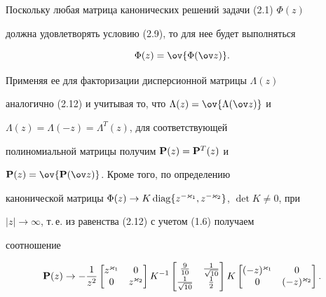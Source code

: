\begin{pf}
 


Поскольку любая матрица канонических решений задачи (2.1) $\Phi(z)$ 


должна удовлетворять условию (2.9), то для нее будет выполняться 


$$ 


\Phi(z)=\ov{\Phi(\ov z)}. 


$$ 


Применяя ее для факторизации дисперсионной матрицы $\Lambda(z)$ 


аналогично (2.12) и учитывая то, что $\Lambda(z)=\ov{\Lambda(\ov z)}$ и 


$\Lambda(z)=\Lambda(-z)=\Lambda^T(z)$, для соответствующей 


полиномиальной матрицы получим $\bold P(z)=\bold P^T(z)$ и 


$\bold P(z)=\ov{\bold P(\ov z)}$. Кроме того, по определению 


канонической матрицы $\Phi(z)\to K\diag 


\{z^{-\varkappa_1},z^{-\varkappa_2}\}$, $\det K\ne0$, при 


$|z|\to\infty$, т.\,е. из равенства (2.12) с учетом (1.6) получаем 


соотношение 


$$ 


\bold P(z)\to-\frac{1}{z^2} 


\begin{bmatrix} 


z^{\varkappa_1} & 0 \\ 0 & z^{\varkappa_2} 


\end{bmatrix} 


K^{-1} 


\begin{bmatrix} 


\frac{9}{10} & \frac{1}{\sqrt{10}} \\ 


\frac{1}{\sqrt{10}} & \frac{1}{2} 


\end{bmatrix} 


K 


\begin{bmatrix} 


(-z)^{\varkappa_1} & 0 \\ 0 & (-z)^{\varkappa_2} 


\end{bmatrix}. 


$$ 



\end{pf}
